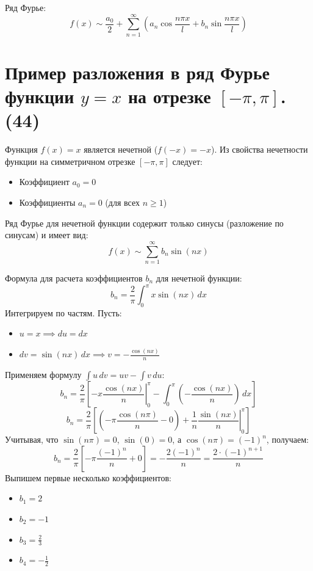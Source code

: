 \documentclass[14pt]{extreport}
\begin{document}
    Ряд Фурье:$$f(x) \sim \frac{a_0}{2} + \sum_{n=1}^{\infty} \left( a_n \cos\frac{n\pi x}{l} + b_n \sin\frac{n\pi x}{l} \right)$$

    \chapter{Пример разложения в ряд Фурье функции $y = x$ на отрезке $[-\pi, \pi]$. (44)}
    Функция $f(x) = x$ является нечетной ($f(-x) = -x$).
Из свойства нечетности функции на симметричном отрезке $[-\pi, \pi]$ следует:
    \begin{itemize}
        \item Коэффициент $a_0 = 0$
        \item Коэффициенты $a_n = 0$ (для всех $n \ge 1$)
    \end{itemize}

    Ряд Фурье для нечетной функции содержит только синусы (разложение по синусам) и имеет вид:$$f(x) \sim \sum_{n=1}^{\infty} b_n \sin(nx)$$

    Формула для расчета коэффициентов $b_n$ для нечетной функции:$$b_n = \frac{2}{\pi} \int_{0}^{\pi} x \sin(nx) \, dx$$Интегрируем по частям. Пусть:

    \begin{itemize}
        \item $u = x \implies du = dx$
        \item $dv = \sin(nx) \, dx \implies v = -\frac{\cos(nx)}{n}$
    \end{itemize}

    Применяем формулу $\int u \, dv = uv - \int v \, du$:$$b_n = \frac{2}{\pi} \left[ \left. -x \frac{\cos(nx)}{n} \right|_0^\pi - \int_{0}^{\pi} \left(-\frac{\cos(nx)}{n}\right) \, dx \right]$$$$b_n = \frac{2}{\pi} \left[ \left( -\pi \frac{\cos(n\pi)}{n} - 0 \right) + \frac{1}{n} \left. \frac{\sin(nx)}{n} \right|_0^\pi \right]$$Учитывая, что $\sin(n\pi) = 0$, $\sin(0) = 0$, а $\cos(n\pi) = (-1)^n$, получаем:$$b_n = \frac{2}{\pi} \left[ -\pi \frac{(-1)^n}{n} + 0 \right] = -\frac{2(-1)^n}{n} = \frac{2 \cdot (-1)^{n+1}}{n}$$Выпишем первые несколько коэффициентов:

    \begin{itemize}
        \item $b_1 = 2$
        \item $b_2 = -1$
        \item $b_3 = \frac{2}{3}$
        \item $b_4 = -\frac{1}{2}$
    \end{itemize}
\end{document}
